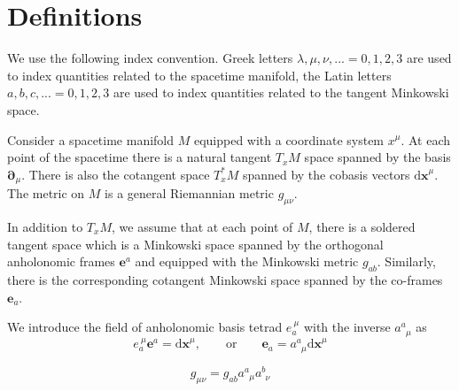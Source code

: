 \documentclass[
10pt, %
a4paper, %
oneside, %
headinclude,footinclude, %
BCOR5mm, %
]{scrartcl}
\newcommand{\xx}{\mathbf{x}}
\newcommand{\dx}{\mathrm{d}\xx}
\newcommand{\pd}{\partial}
\newcommand{\itetr}[2]{e^{\ #1}_{#2}}
\newcommand{\tetr}[2]{a^{#1}_{\phantom{#1}#2}}
\begin{document}


\setlength\parindent{10pt} %
\setlength{\parskip}{5pt} %


\section{Definitions}

We use the following index convention. Greek letters $ \lambda,\mu,\nu,... =0,1,2,3
$ are used to index quantities related to the spacetime manifold, the Latin letters $ a,b,c,... 
=0,1,2,3$ are used to index quantities related to the tangent Minkowski space.



Consider a spacetime manifold $ M $ equipped with a coordinate system $ x^\mu $. At each point of 
the spacetime there is a natural tangent $ T_{x}M $ space spanned by the basis $ \bm{\pd}_\mu $. 
There is also the cotangent space $ T_x^*M $ spanned by the cobasis vectors $ \bm{\dx}^\mu $.
The metric on $ M $ is a general Riemannian metric $ g_{\mu\nu} $.

In addition to $ T_{x}M $, we assume that at each point of $ M $, there is a soldered tangent space 
which is a Minkowski space spanned by the orthogonal anholonomic 
frames $ \bm{e}^a $ and equipped with the Minkowski metric $ g_{ab} $. Similarly, there is the 
corresponding cotangent Minkowski space spanned by the co-frames $ \bm{e}_a $. 

We introduce the field of anholonomic basis tetrad $ \itetr{\mu}{a} $ with the inverse $ 
\tetr{a}{\mu} $ as
\begin{equation}
\itetr{\mu}{a} \bm{e}^a = \bm{\dx}^\mu, \qquad \text{or} \qquad \bm{e}_a = \tetr{a}{\mu}\bm{\dx}^\mu
\end{equation}


\begin{equation}
g_{\mu\nu} = g_{ab} \tetr{a}{\mu}\tetr{b}{\nu}
\end{equation}
\end{document}
